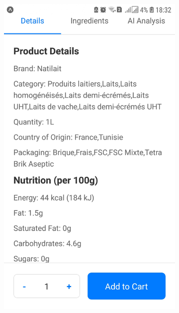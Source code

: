 \begin{figure}[h!]
\begin{subfigure}[b]{0.23\textwidth}
        \includegraphics[width=\textwidth]{images/natilait2.jpg}
    \end{subfigure}
    \begin{subfigure}[b]{0.23\textwidth}
        \centering

\end{subfigure}
\end{figure}
